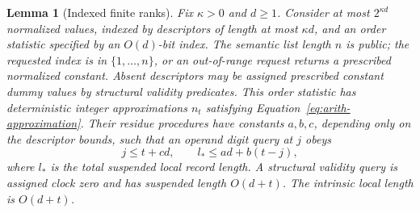 \documentclass[11pt]{article}
\numberwithin{equation}{section}
\newtheorem{lemma}[theorem]{Lemma}
\theoremstyle{definition}
\theoremstyle{remark}
\begin{document}
\begin{lemma}[Indexed finite ranks]
\label{lem:arith-rank}
Fix $\kappa>0$ and $d\geq1$.  Consider at most $2^{\kappa d}$
normalized values, indexed by descriptors of length at most
$\kappa d$, and an order statistic specified by an $O(d)$-bit
index.  The semantic list length $n$ is public; the requested index
is in $\{1,\ldots,n\}$, or an out-of-range request returns a
prescribed normalized constant.  Absent descriptors may be assigned
prescribed constant dummy values by structural validity predicates.
This order statistic has deterministic integer approximations ${n}_t$
satisfying Equation~\eqref{eq:arith-approximation}.  Their residue
procedures have constants $a,b,c$, depending only on the descriptor
bounds, such that an operand digit query at $j$ obeys
\begin{equation}
 j\leq t+cd,\qquad
 {l_*}\leq ad+b(t-j),
 \label{eq:arith-local-bound}
\end{equation}
where ${l_*}$ is the total suspended local record length.  A structural
validity query is assigned clock zero and has suspended length
$O(d+t)$.  The intrinsic local length is $O(d+t)$.
\end{lemma}
\end{document}
